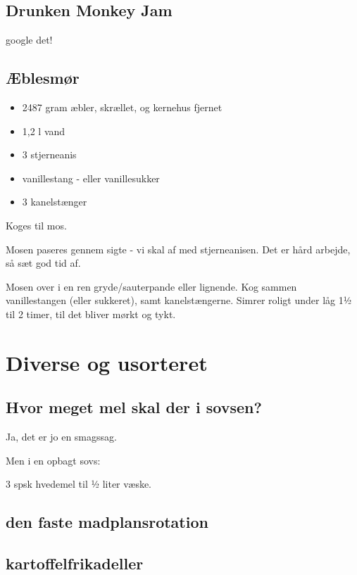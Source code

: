 \documentclass[
]{book}
\providecommand{\tightlist}{%
  \setlength{\itemsep}{0pt}\setlength{\parskip}{0pt}}
\begin{document}
\section{Drunken Monkey Jam}\label{drunken-monkey-jam}

google det!

\section{Æblesmør}\label{uxe6blesmuxf8r}

\begin{itemize}
\tightlist
\item
  2487 gram æbler, skrællet, og kernehus fjernet
\item
  1,2 l vand
\item
  3 stjerneanis
\item
  vanillestang - eller vanillesukker
\item
  3 kanelstænger
\end{itemize}

Koges til mos.

Mosen paseres gennem sigte - vi skal af med stjerneanisen.
Det er hård arbejde, så sæt god tid af.

Mosen over i en ren gryde/sauterpande eller lignende.
Kog sammen vanillestangen (eller sukkeret), samt kanelstængerne.
Simrer roligt under låg 1½ til 2 timer, til det bliver mørkt og tykt.

\chapter{Diverse og usorteret}\label{diverse-og-usorteret}

\section{Hvor meget mel skal der i sovsen?}\label{hvor-meget-mel-skal-der-i-sovsen}

Ja, det er jo en smagssag.

Men i en opbagt sovs:

3 spsk hvedemel til ½ liter væske.

\section{den faste madplansrotation}\label{den-faste-madplansrotation}

\section{kartoffelfrikadeller}\label{kartoffelfrikadeller}
\end{document}
